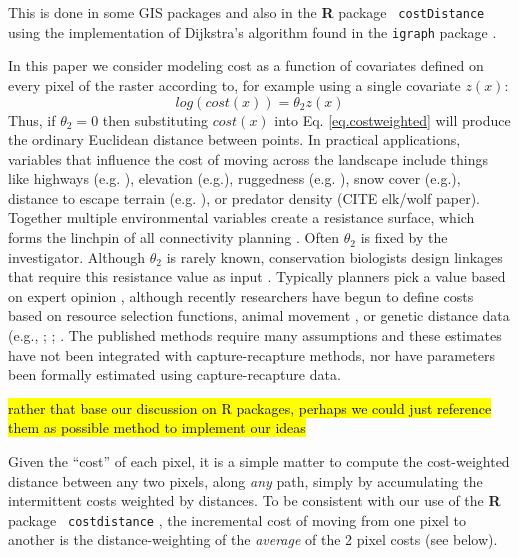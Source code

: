 \documentclass[12pt]{article}
\begin{document}
  This is
done in some GIS packages and also in the {\bf R} package \mbox{\tt
  costDistance} using the implementation of Dijkstra's algorithm
\citep{dijkstra:1959} found in the \mbox{\tt igraph} package
\citep{csardi:2010}.


In this paper we consider modeling cost as a function of covariates
defined on every pixel of the raster according to, for example using a
single
covariate $z(x)$:
\begin{equation}
 log(cost(x))=  \theta_{2} z(x)
\label{eq.cost}
\end{equation}
Thus, if $\theta_{2} = 0$ then substituting $cost(x)$ into
Eq. \ref{eq.costweighted} will produce the ordinary Euclidean distance
between points.
In practical applications, variables that
influence the cost of moving across the landscape include things like
highways (e.g. \citet{epps_etal:2005}), elevation
(e.g.\citet{cushman_etal:2006}),
ruggedness (e.g. \citet{epps_etal:2007}), snow cover (e.g.\citet{schwartz_etal:2009}),
distance to escape terrain (e.g. \citet{shirk_etal:2010}), or predator density
(CITE elk/wolf paper).  Together multiple environmental variables create
a resistance surface, which forms the linchpin of all connectivity
planning \citep{spear_etal:2010}.  Often $\theta_{2}$ is fixed by the
investigator. Although
 $\theta_{2}$ is rarely known,
 conservation
biologists design linkages that require this resistance value as input
\citep{beier_etal:2008}.  Typically planners pick a value based on
expert opinion \citep{beier_etal:2007}, although recently researchers
have begun to define costs based on resource selection functions,
animal movement \citep{tracy:2006, dickenson_etal:2005}, or genetic
distance data (e.g., \citet{gerlach_musolf:2000};
\citet{epps_etal:2007}; \citet{schwartz_etal:2009}. The published
methods require many assumptions and these estimates have not been
integrated with capture-recapture methods, nor have parameters been
formally estimated using capture-recapture data.

\hl{rather that base our discussion on R packages, perhaps we could
  just reference them as possible method to implement our ideas}

Given the ``cost'' of each pixel, it is a simple matter to compute the
cost-weighted distance between any two pixels, along {\it any} path,
simply by accumulating the intermittent costs weighted by distances.
To be consistent with our use of the {\bf R} package \mbox{\tt
  costdistance} \citep{vanetten:2011}, the incremental cost of moving
from one pixel to another is the distance-weighting of the {\it
  average} of the 2 pixel costs (see below).  
\end{document}
